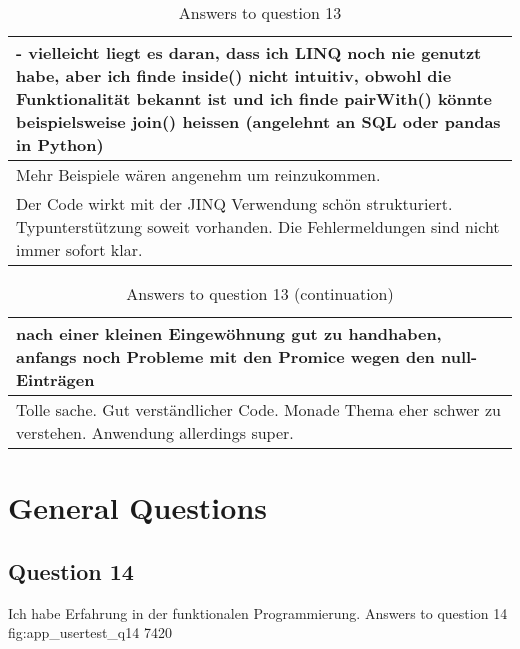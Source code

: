 \begin{table}[H]
\begin{tabularx}{\textwidth}{| X |}
    - vielleicht liegt es daran, dass ich LINQ noch nie genutzt habe, aber ich finde inside() nicht intuitiv, obwohl die Funktionalität bekannt ist und ich finde pairWith() könnte beispielsweise join() heissen (angelehnt an SQL oder pandas in Python) \\ \hline 
    Mehr Beispiele wären angenehm um reinzukommen. \\ \hline 
    Der Code wirkt mit der JINQ Verwendung schön strukturiert. Typunterstützung soweit vorhanden. Die Fehlermeldungen sind nicht immer sofort klar. \\ \hline 
  \end{tabularx}
  \caption{Answers to question 13}
  \label{tab:app_usertest_q13}
\end{table}

\begin{table}[H]
  \centering
  \begin{tabularx}{\textwidth}{| X |} \hline
    nach einer kleinen Eingewöhnung gut zu handhaben, anfangs noch Probleme mit den Promice wegen den null-Einträgen \\ \hline 
    Tolle sache. Gut verständlicher Code. Monade Thema eher schwer zu verstehen. Anwendung allerdings super. \\ \hline 
  \end{tabularx}
  \caption{Answers to question 13 (continuation)}
  \label{tab:app_usertest_q13}
\end{table}

\section{General Questions} %
\label{sec:General Questions}

\subsection*{Question 14}
\label{sub:ut_q14}
Ich habe Erfahrung in der funktionalen Programmierung.
\likertbarchart
  {Answers to question 14}
  {fig:app_usertest_q14}
  {7}{4}{2}{0}
  
